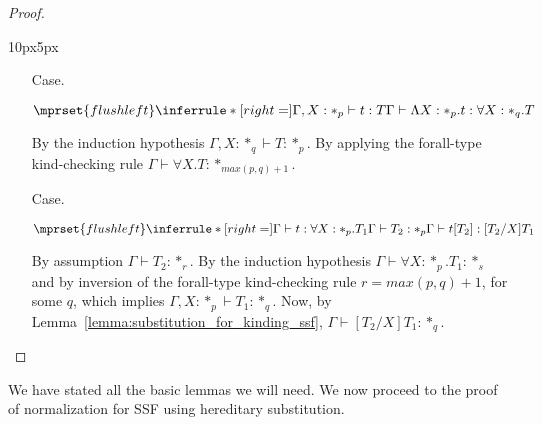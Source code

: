\begin{proof}
\begin{changemargin}{10px}{5px}
\begin{itemize}
\item[Case.] \ \\
  \begin{center}
    \begin{math}
      $$\mprset{flushleft}
      \inferrule* [right=] {
        \Gamma, X : *_p \vdash t : T
      }{\Gamma \vdash \Lambda X:*_p.t:\forall X : *_q.T}
    \end{math}
  \end{center}
  By the induction hypothesis $\Gamma,X:*_q \vdash T:*_p$.  By applying
  the forall-type kind-checking rule $\Gamma \vdash \forall X.T:*_{max(p,q)+1}$.
  
\item[Case.] \ \\
  \begin{center}
    \begin{math}
      $$\mprset{flushleft}
      \inferrule* [right=] {
        \Gamma \vdash t:\forall X:*_p.T_1
        \\
        \Gamma \vdash T_2:*_p
      }{\Gamma \vdash t[T_2]: [T_2/X]T_1}
    \end{math}
  \end{center}
  By assumption $\Gamma \vdash T_2:*_r$.  By the induction hypothesis 
  $\Gamma \vdash \forall X:*_p.T_1:*_s$ and by inversion of the forall-type
  kind-checking rule $r = max(p,q)+1$, for some $q$, which implies 
  $\Gamma,X:*_p \vdash T_1:*_q$.  Now, by Lemma~\ref{lemma:substitution_for_kinding_ssf},
  $\Gamma \vdash [T_2/X]T_1:*_q$.
\end{itemize}
\end{changemargin}
\end{proof}
\noindent
We have stated all the basic lemmas we will need.  We now proceed to
the proof \\ of normalization for SSF using hereditary substitution.

